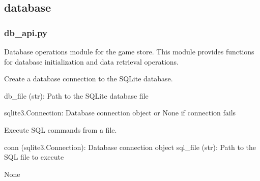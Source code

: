 \documentclass[letterpaper,10pt,english]{sphinxmanual}
\begin{document}
\subsection{database}
\label{\detokenize{store-service:database}}

\subsubsection{db\_api.py}
\label{\detokenize{store-service:module-db_api}}\label{\detokenize{store-service:db-api-py}}
\sphinxAtStartPar
Database operations module for the game store. This module provides functions for database initialization and data retrieval operations.

\begin{fulllineitems}
\label{\detokenize{store-service:db_api.create_connection}}
\pysigstartsignatures
\pysiglinewithargsret
{}
{}
{}
\pysigstopsignatures
\sphinxAtStartPar
Create a database connection to the SQLite database.
\begin{description}
\sphinxAtStartPar
db\_file (str): Path to the SQLite database file

\sphinxAtStartPar
sqlite3.Connection: Database connection object or None if connection fails

\end{description}

\end{fulllineitems}


\begin{fulllineitems}
\label{\detokenize{store-service:db_api.execute_sql_file}}
\pysigstartsignatures
\pysiglinewithargsret
{}
{\sphinxparamcomma {}}
{}
\pysigstopsignatures
\sphinxAtStartPar
Execute SQL commands from a file.
\begin{description}
\sphinxAtStartPar
conn (sqlite3.Connection): Database connection object
sql\_file (str): Path to the SQL file to execute

\sphinxAtStartPar
None

\end{description}

\end{fulllineitems}
\end{document}
